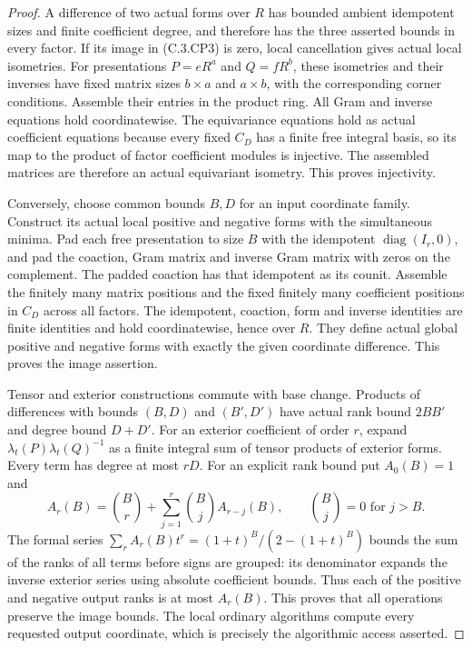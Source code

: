 \begin{proof}
A difference of two actual
forms over $R$ has bounded
ambient idempotent sizes
and finite coefficient degree,
and therefore has the three
asserted bounds in every
factor.
If its image in (C.3.CP3)
is zero, local cancellation
gives actual local isometries.
For presentations $P=eR^a$
and $Q=fR^b$, these isometries
and their inverses have
fixed matrix sizes $b\times a$
and $a\times b$, with the
corresponding corner conditions.
Assemble their entries in
the product ring.
All Gram and inverse equations
hold coordinatewise.
The equivariance equations
hold as actual coefficient
equations because every
fixed $C_D$ has a finite
free integral basis, so
its map to the product
of factor coefficient
modules is injective.
The assembled matrices
are therefore an actual
equivariant isometry.
This proves injectivity.

Conversely, choose common
bounds $B,D$ for an input
coordinate family.
Construct its actual local
positive and negative forms
with the simultaneous minima.
Pad each free presentation
to size $B$ with the
idempotent $\operatorname{diag}(I_r,0)$,
and pad the coaction, Gram
matrix and inverse Gram
matrix with zeros on the
complement.
The padded coaction has
that idempotent as its
counit.
Assemble the finitely many
matrix positions and the
fixed finitely many coefficient
positions in $C_D$ across
all factors.
The idempotent, coaction,
form and inverse identities
are finite identities and
hold coordinatewise, hence
over $R$.
They define actual global
positive and negative forms
with exactly the given
coordinate difference.
This proves the image assertion.

Tensor and exterior constructions
commute with base change.
Products of differences with
bounds $(B,D)$ and $(B',D')$
have actual rank bound $2BB'$
and degree bound $D+D'$.
For an exterior coefficient
of order $r$, expand
$\lambda_t(P)\lambda_t(Q)^{-1}$
as a finite integral sum
of tensor products of
exterior forms.
Every term has degree at
most $rD$.
For an explicit rank bound
put $A_0(B)=1$ and
\[
 A_r(B)=\binom Br+
       \sum_{j=1}^r\binom Bj A_{r-j}(B),
 \qquad \binom Bj=0\text{ for }j>B.                     \tag{C.3.CP4}
\]
The formal series
$\sum_r A_r(B)t^r=(1+t)^B/(2-(1+t)^B)$
bounds the sum of the ranks
of all terms before signs
are grouped: its denominator
expands the inverse exterior
series using absolute
coefficient bounds.
Thus each of the positive
and negative output ranks
is at most $A_r(B)$.
This proves that all
operations preserve the
image bounds.
The local ordinary algorithms
compute every requested
output coordinate, which
is precisely the algorithmic
access asserted.
\end{proof}
